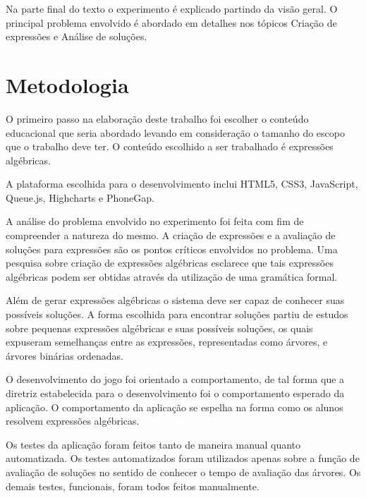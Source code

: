 	Na parte final do texto o experimento é explicado partindo da visão geral. O principal problema envolvido é abordado em detalhes nos tópicos Criação de expressões e Análise de soluções.
	
\section{Metodologia}
O primeiro passo na elaboração deste trabalho foi escolher o conteúdo educacional que seria abordado levando em consideração o tamanho do escopo que o trabalho deve ter. O conteúdo escolhido a ser trabalhado é expressões algébricas.

	A plataforma escolhida para o desenvolvimento inclui HTML5, CSS3, JavaScript, Queue.js, Highcharts e PhoneGap.
	
	A análise do problema envolvido no experimento foi feita com fim de compreender a natureza do mesmo. A criação de expressões e a avaliação de soluções para expressões são os pontos críticos envolvidos no problema. Uma pesquisa sobre criação de expressões algébricas esclarece que tais expressões algébricas podem ser obtidas através da utilização de uma gramática formal.
	
	Além de gerar expressões algébricas o sistema deve ser capaz de conhecer suas possíveis soluções. A forma escolhida para encontrar soluções partiu de estudos sobre pequenas expressões algébricas e suas possíveis soluções, os quais expuseram semelhanças entre as expressões, representadas como árvores, e árvores binárias ordenadas.
	
	O desenvolvimento do jogo foi orientado a comportamento, de tal forma que a diretriz estabelecida para o desenvolvimento foi o comportamento esperado da aplicação. O comportamento da aplicação se espelha na forma como os alunos resolvem expressões algébricas.
	
	Os testes da aplicação foram feitos tanto de maneira manual quanto automatizada. Os testes automatizados foram utilizados apenas sobre a função de avaliação de soluções no sentido de conhecer o tempo de avaliação das árvores. Os demais testes, funcionais, foram todos feitos manualmente.
